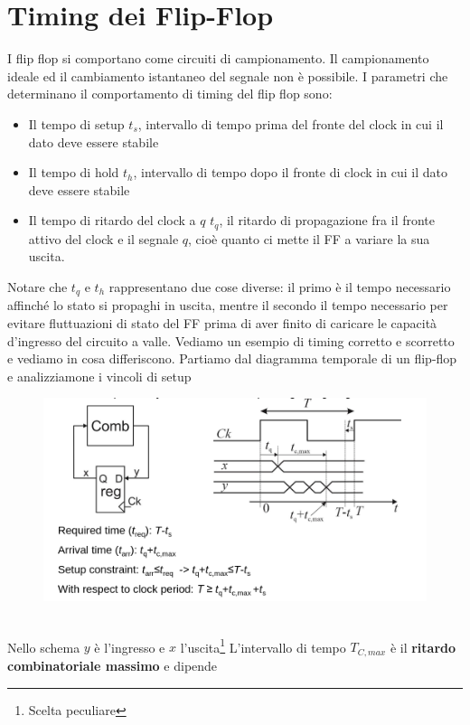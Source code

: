 \documentclass{book}
\begin{document}
    \section{Timing dei Flip-Flop}
        I flip flop si comportano come circuiti di campionamento. Il campionamento ideale
        ed il cambiamento istantaneo del segnale non è possibile. I parametri che determinano
        il comportamento di timing del flip flop sono:
        \begin{itemize}
            \item Il tempo di setup $t_{s}$, intervallo di tempo prima del fronte del clock
            in cui il dato deve essere stabile 
            \item Il tempo di hold $t_{h}$, intervallo di tempo dopo il fronte di clock in cui il dato deve essere stabile
            \item Il tempo di ritardo del clock a $q$ $t_{q}$, il ritardo di propagazione fra il fronte attivo del clock
            e il segnale $q$, cioè quanto ci mette il FF a variare la sua uscita.
        \end{itemize}
        Notare che $t_{q}$ e $t_{h}$ rappresentano due cose diverse: il primo è il tempo necessario
        affinché lo stato si propaghi in uscita, mentre il secondo il tempo necessario per evitare fluttuazioni
        di stato del FF prima di aver finito di caricare le capacità d'ingresso del circuito a valle.
        Vediamo un esempio di timing corretto e scorretto e vediamo in cosa differiscono.
        Partiamo dal diagramma temporale di un flip-flop e analizziamone i vincoli di setup
        \begin{figure}[h!]
            \center  
            \includegraphics[width=0.75\linewidth]{img/chapt12img3.png}
        \end{figure} \\
        Nello schema $y$ è l'ingresso e $x$ l'uscita\footnote{Scelta peculiare}
        L'intervallo di tempo $T_{C,max}$ è il \textbf{ritardo combinatoriale massimo} e dipende
\end{document}
